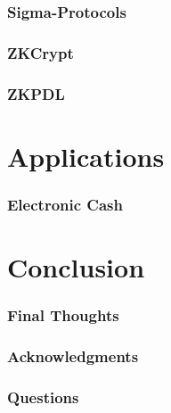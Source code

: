 \documentclass{beamer}
\begin{document}
\begin{frame}
	\frametitle{Sigma-Protocols}
\end{frame}

\begin{frame}
	\frametitle{ZKCrypt}
\end{frame}

\begin{frame}
	\frametitle{ZKPDL}
\end{frame}

\section*{Applications}

\begin{frame}
	\frametitle{Electronic Cash}
\end{frame}

\section*{Conclusion}

\begin{frame}
	\frametitle{Final Thoughts}
\end{frame}

\begin{frame}
	\frametitle{Acknowledgments}
\end{frame}

\begin{frame}
	\frametitle{Questions}
\end{frame}
\end{document}

